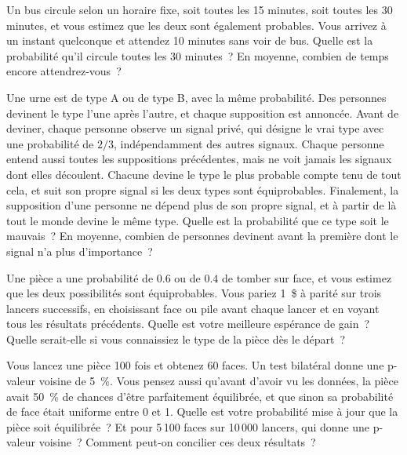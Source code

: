 \begin{question}\label{iq:iv1:conditional-probability-and-bayes:35}
Un bus circule selon un horaire fixe, soit toutes les 15 minutes, soit toutes les 30 minutes, et vous estimez que les deux sont également probables. Vous arrivez à un instant quelconque et attendez 10 minutes sans voir de bus. Quelle est la probabilité qu'il circule toutes les 30 minutes~? En moyenne, combien de temps encore attendrez-vous~?
\end{question}

\begin{question}\label{iq:iv1:conditional-probability-and-bayes:36}
Une urne est de type A ou de type B, avec la même probabilité. Des personnes devinent le type l'une après l'autre, et chaque supposition est annoncée. Avant de deviner, chaque personne observe un signal privé, qui désigne le vrai type avec une probabilité de $2/3$, indépendamment des autres signaux. Chaque personne entend aussi toutes les suppositions précédentes, mais ne voit jamais les signaux dont elles découlent. Chacune devine le type le plus probable compte tenu de tout cela, et suit son propre signal si les deux types sont équiprobables. Finalement, la supposition d'une personne ne dépend plus de son propre signal, et à partir de là tout le monde devine le même type. Quelle est la probabilité que ce type soit le mauvais~? En moyenne, combien de personnes devinent avant la première dont le signal n'a plus d'importance~?
\end{question}

\begin{question}\label{iq:iv1:conditional-probability-and-bayes:37}
Une pièce a une probabilité de $0.6$ ou de $0.4$ de tomber sur face, et vous estimez que les deux possibilités sont équiprobables. Vous pariez 1~\$ à parité sur trois lancers successifs, en choisissant face ou pile avant chaque lancer et en voyant tous les résultats précédents. Quelle est votre meilleure espérance de gain~? Quelle serait-elle si vous connaissiez le type de la pièce dès le départ~?
\end{question}

\begin{question}\label{iq:iv1:conditional-probability-and-bayes:38}
Vous lancez une pièce 100 fois et obtenez 60 faces. Un test bilatéral donne une p-valeur voisine de 5~\%. Vous pensez aussi qu'avant d'avoir vu les données, la pièce avait 50~\% de chances d'être parfaitement équilibrée, et que sinon sa probabilité de face était uniforme entre 0 et 1. Quelle est votre probabilité mise à jour que la pièce soit équilibrée~? Et pour 5\,100 faces sur 10\,000 lancers, qui donne une p-valeur voisine~? Comment peut-on concilier ces deux résultats~?
\end{question}

